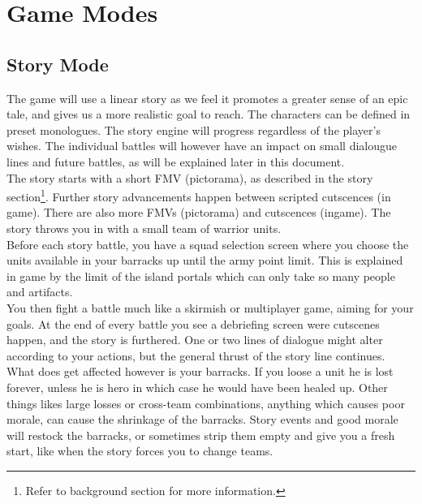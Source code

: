 \documentclass[a4paper,twocolumn]{article}
\begin{document}
\newpage \section{Game Modes}

\subsection{Story Mode}

The game will use a linear story as we feel it promotes a greater sense of an epic tale, and gives us a more realistic goal to reach. The characters can be defined in preset monologues. The story engine will progress regardless of the player's wishes. The individual battles will however have an impact on small dialougue lines and future battles, as will be explained later in this document.\\

The story starts with a short FMV (pictorama), as described in the story section\footnote {Refer to background section for more information.}. Further story advancements happen between scripted cutscences (in game). There are also more FMVs (pictorama) and cutscences (ingame). The story throws you in with a small team of warrior units.\\

Before each story battle, you have a squad selection screen where you choose the units available in your barracks up until the army point limit. This is explained in game by the limit of the island portals which can only take so many people and artifacts.\\

You then fight a battle much like a skirmish or multiplayer game, aiming for your goals. At the end of every battle you see a debriefing screen were cutscenes happen, and the story is furthered. One or two lines of dialogue might alter according to your actions, but the general thrust of the story line continues.\\

What does get affected however is your barracks. If you loose a unit he is lost forever, unless he is hero in which case he would have been healed up. Other things likes large losses or cross-team combinations, anything which causes poor morale, can cause the shrinkage of the barracks. Story events and good morale will restock the barracks, or sometimes strip them empty and give you a fresh start, like when the story forces you to change teams.\\
\end{document}
